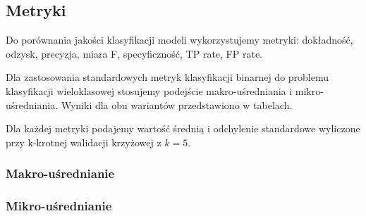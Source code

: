 \documentclass{article}
\begin{document}
\newpage
\subsection{Metryki}
Do porównania jakości klasyfikacji modeli wykorzystujemy metryki:
dokładność, odzysk, precyzja, miara F, specyficzność, TP rate, FP rate.

Dla zastosowania standardowych metryk klasyfikacji binarnej do problemu klasyfikacji wieloklasowej stosujemy
podejście makro-uśredniania i mikro-uśredniania. Wyniki dla obu wariantów przedstawiono w tabelach.

Dla każdej metryki podajemy wartość średnią i odchylenie standardowe wyliczone przy
k-krotnej walidacji krzyżowej z $k=5$.


\subsubsection*{Makro-uśrednianie}
\begin{table}[h!]
    \centering
    \begin{adjustbox}{valign=c, width=\textwidth}
    \end{adjustbox}
    \label{tab:metrics-macro-1}
\end{table}

\begin{table}[h!]
    \centering
    \begin{adjustbox}{valign=c, width=\textwidth}
    \end{adjustbox}
    \label{tab:metrics-macro-2}
\end{table}

\subsubsection*{Mikro-uśrednianie}

\begin{table}[h!]
    \centering
    \begin{adjustbox}{valign=c, width=\textwidth}
    \end{adjustbox}
    \label{tab:metrics-micro-1}
\end{table}

\begin{table}[h!]
    \centering
    \begin{adjustbox}{valign=c, width=\textwidth}
    \end{adjustbox}
    \label{tab:metrics-micro-2}
\end{table}
\end{document}
